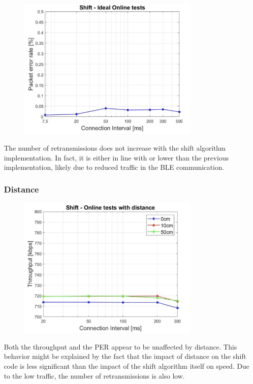 \documentclass{Configuration_Files/PoliMi3i_thesis}
\begin{document}
\begin{figure}[H]
    \centering
    \includegraphics[width=0.8\textwidth]{Results Manuel/figure16}
    \label{fig:figure1}
\end{figure}

The number of retransmissions does not increase with the shift algorithm implementation. In fact, it is either in line with or lower than the previous implementation, likely due to reduced traffic in the BLE communication.

\subsubsection*{Distance}

\begin{figure}[H]
    \centering
    \includegraphics[width=0.8\textwidth]{Results Manuel/figure17}
    \label{fig:figure1}
\end{figure}

Both the throughput and the PER appear to be unaffected by distance. This behavior might be explained by the fact that the impact of distance on the shift code is less significant than the impact of the shift algorithm itself on speed. Due to the low traffic, the number of retransmissions is also low.
\end{document}
